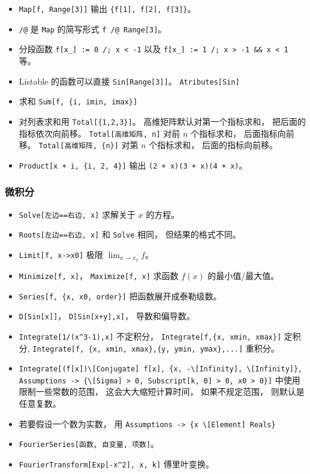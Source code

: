 \begin{itemize}
\item \verb|Map[f, Range[3]]| 输出 \verb|{f[1], f[2], f[3]}|。
\item \verb|/@| 是 \verb|Map| 的简写形式 \verb|f /@ Range[3]|。
\item 分段函数 \verb|f[x_] := 0 /; x < -1| 以及 \verb|f[x_] := 1 /; x > -1 && x < 1| 等。
\item Listable 的函数可以直接 \verb|Sin[Range[3]]|。 \verb|Atributes[Sin]|
\item 求和 \verb|Sum[f, {i, imin, imax}]|
\item 对列表求和用 \verb|Total[{1,2,3}]|。 高维矩阵默认对第一个指标求和， 把后面的指标依次向前移。 \verb|Total[高维矩阵, n]| 对前 $n$ 个指标求和， 后面指标向前移。 \verb|Total[高维矩阵, {n}]| 对第 $n$ 个指标求和， 后面的指标向前移。
\item \verb|Product[x + i, {i, 2, 4}]| 输出 \verb|(2 + x)(3 + x)(4 + x)|。
\end{itemize}

\subsubsection{微积分}
\begin{itemize}
\item \verb|Solve[左边==右边, x]| 求解关于 $x$ 的方程。
\item \verb|Roots[左边==右边, x]| 和 \verb|Solve| 相同， 但结果的格式不同。
\item \verb|Limit[f, x->x0]| 极限 $\lim_{x\to x_0} f$。
\item \verb|Minimize[f, x]|， \verb|Maximize[f, x]| 求函数 $f(x)$ 的最小值/最大值。
\item \verb|Series[f, {x, x0, order}]| 把函数展开成泰勒级数。
\item \verb|D[Sin[x]]|， \verb|D[Sin[x+y],x]|， 导数和偏导数。
\item \verb|Integrate[1/(x^3-1),x]| 不定积分， \verb|Integrate[f,{x, xmin, xmax}]| 定积分, \verb|Integrate[f, {x, xmin, xmax},{y, ymin, ymax},...]| 重积分。
\item \verb|Integrate[(f[x])\[Conjugate] f[x], {x, -\[Infinity], \[Infinity]}, Assumptions -> {\[Sigma] > 0, Subscript[k, 0] > 0, x0 > 0}]| 中使用限制一些常数的范围， 这会大大缩短计算时间， 如果不规定范围， 则默认是任意复数。
\item 若要假设一个数为实数， 用 \verb|Assumptions -> {x \[Element] Reals}|
\item \verb|FourierSeries[函数, 自变量, 项数]|。
\item \verb|FourierTransform[Exp[-x^2], x, k]| 傅里叶变换。
\end{itemize}

